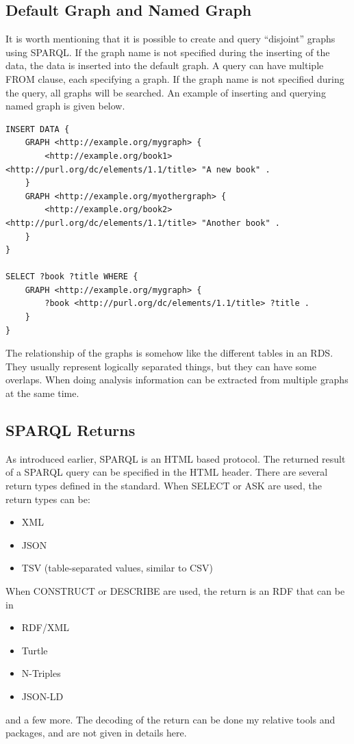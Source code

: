 \subsection{Default Graph and Named Graph}

It is worth mentioning that it is possible to create and query ``disjoint'' graphs using SPARQL. If the graph name is not specified during the inserting of the data, the data is inserted into the default graph. A query can have multiple FROM clause, each specifying a graph. If the graph name is not specified during the query, all graphs will be searched. An example of inserting and querying named graph is given below.

\begin{lstlisting}
INSERT DATA {
	GRAPH <http://example.org/mygraph> { 
		<http://example.org/book1> <http://purl.org/dc/elements/1.1/title> "A new book" .
	}
	GRAPH <http://example.org/myothergraph> { 
		<http://example.org/book2> <http://purl.org/dc/elements/1.1/title> "Another book" .
	}
}

SELECT ?book ?title WHERE {
	GRAPH <http://example.org/mygraph> {
		?book <http://purl.org/dc/elements/1.1/title> ?title .
	}
}
\end{lstlisting}

The relationship of the graphs is somehow like the different tables in an RDS. They usually represent logically separated things, but they can have some overlaps. When doing analysis information can be extracted from multiple graphs at the same time.

\subsection{SPARQL Returns}

As introduced earlier, SPARQL is an HTML based protocol. The returned result of a SPARQL query can be specified in the HTML header. There are several return types defined in the standard. When SELECT or ASK are used, the return types can be:
\begin{itemize}
	\item XML
	\item JSON
	\item TSV (table-separated values, similar to CSV)
\end{itemize}
When CONSTRUCT or DESCRIBE are used, the return is an RDF that can be in 
\begin{itemize}
	\item RDF/XML
	\item Turtle
	\item N-Triples
	\item JSON-LD
\end{itemize}
and a few more. The decoding of the return can be done my relative tools and packages, and are not given in details here.


